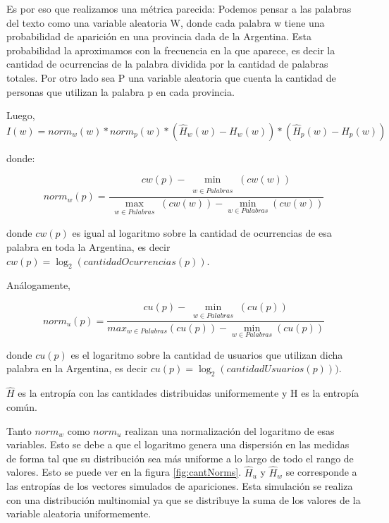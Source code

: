 Es por eso que realizamos una métrica parecida:
Podemos pensar a las palabras del texto como una variable aleatoria W, donde cada palabra w tiene una probabilidad de aparición en una provincia dada de la Argentina. Esta probabilidad la aproximamos con la frecuencia en la que aparece, es decir la cantidad de ocurrencias de la palabra dividida por la cantidad de palabras totales.
Por otro lado sea P una variable aleatoria que cuenta la cantidad de personas que 
utilizan la palabra p en cada provincia.

Luego,
\begin{equation}
I(w) =  norm_{w}(w) * norm_{p}(w) * (\widehat{H}_{w}(w) - H_{w}(w)) * (\widehat{H}_{p}(w) - H_{p}(w))
\end{equation}

donde:

\[ norm_{w}(p) = \frac{cw(p)- \min_{\substack{\\w \in Palabras}} (cw(w)) }{\max_{\substack{w \in Palabras}} (cw(w)) - \min_{w \in Palabras}(cw(w))} \]

donde $cw(p)$ es igual al logaritmo sobre la cantidad de ocurrencias de esa palabra en toda la Argentina, es decir $cw(p) = \log_2(cantidadOcurrencias(p))$.

Análogamente,

\[
norm_{u}(p) = \frac{cu(p)- \min_{\substack{w \in Palabras}} (cu(p)) }{max_{w \in Palabras}(cu(p)) - \min_{w \in Palabras}(cu(p))}
\] 

donde $cu(p)$ es el logaritmo sobre  la cantidad de usuarios que utilizan dicha palabra en la Argentina, es decir $cu(p)= \log_2(cantidadUsuarios(p)))$.


$\widehat{H}$ es la entropía con las cantidades distribuidas uniformemente y H es la entropía común.

Tanto $norm_{w}$ como $norm_{u}$ realizan una normalización del logaritmo de esas variables. Esto se debe a que el logaritmo genera una dispersión en las medidas de forma tal que su distribución sea más uniforme a lo largo de todo el rango de valores. Esto se puede ver en la figura \ref{fig:cantNorms}.
$\widehat{H}_{u}$ y $\widehat{H}_{w}$ se corresponde a las entropías de los vectores simulados de apariciones.
Esta simulación se realiza con una distribución multinomial ya que se distribuye la suma de los valores de la variable aleatoria uniformemente. 

